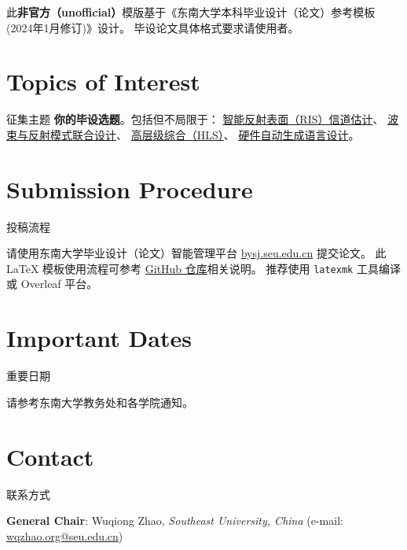 \documentclass[a4paper, 12pt]{article}
\newcommand\secondColor{seuYellow}
\begin{document}
\begin{warning}
  此\textbf{非官方（unofficial）}模版基于《东南大学本科毕业设计（论文）参考模板 (2024年1月修订)》设计。
  毕设论文具体格式要求请使用者。
\end{warning}

\section{Topics of Interest}{征集主题}
\textbf{你的毕设选题}。包括但不局限于：
\href{https://wqzhao.org/pub/zhao2023ompl}{智能反射表面（RIS）信道估计}、
\href{https://wqzhao.org/pub/you2023beam}{波束与反射模式联合设计}、
\href{https://wqzhao.org/pub/zhao2023flexible}{高层级综合（HLS）}、
\href{https://wqzhao.org/pub/zhao2023automatic}{硬件自动生成语言设计}。

\section{Submission Procedure}{投稿流程}

请使用东南大学毕业设计（论文）智能管理平台 \href{https://bysj.seu.edu.cn}{\ttfamily bysj.seu.edu.cn} 提交论文。
此 \LaTeX{} 模板使用流程可参考 \href{https://github.com/Teddy-van-Jerry/seuthesis2024b}{GitHub 仓库}相关说明。
推荐使用 \texttt{latexmk} 工具编译或 Overleaf 平台。

\section{Important Dates}{重要日期}

请参考东南大学教务处和各学院通知。

\section{Contact}{联系方式}

\noindent
\textbf{General Chair}: Wuqiong Zhao, \textit{Southeast University, China} (e-mail: \href{mailto:wqzhao.org@seu.edu.cn}{\ttfamily wqzhao.org@seu.edu.cn})
\end{document}
